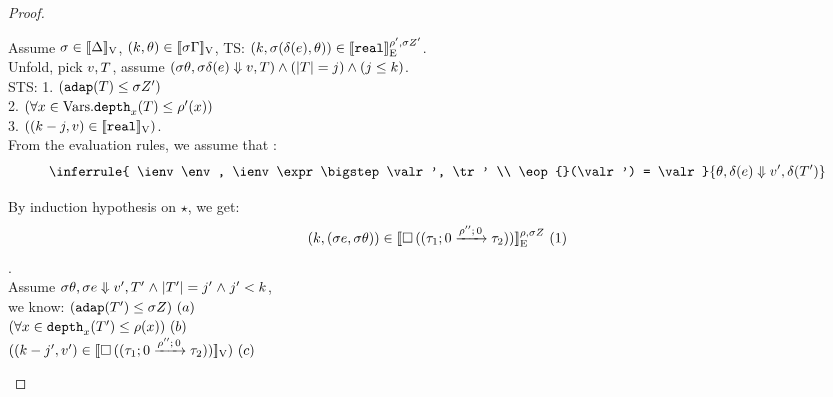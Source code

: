\documentclass[a4paper,11pt]{article}
\theoremstyle{definition}
\begin{document}
\begin{proof}
\begin{mainitem}
Assume $ \ienv \in \lrv{\Delta}$, $(\stepiA, \env) \in \lrv{\ienv \Gamma}$, TS: $(\stepiA, \ienv (\eop(\expr), \env)) \in \lre{\dmap'}{\ienv \nnatA'}{\treal}$.\\
%
Unfold, pick $\valr, \tr$, assume  $(\ienv \env, \ienv \eop(\expr) \bigstep \valr, \tr) \land (\size{\tr} = j) \land (j \leq \stepiA)$.\\
%
STS: 
1.
$(\adap(\tr) \leq \ienv \nnatA') $ \\ 
2. $ (\forall x \in \mbox{Vars}. \ddep{x}(\tr) \leq \dmap'(x)) $ \\
3.  $ ((\stepiA - j, \valr) \in \lrv{\treal})$.\\
%
From the evaluation rules, we assume that :
\[
 \inferrule{
    \ienv \env, \ienv \expr \bigstep \valr', \tr' \\
    \eop{}(\valr') = \valr
  }{
    \env, \eop(\expr) \bigstep \valr', \trop(\tr')
  }
\]

By induction hypothesis on $\star$, we get:
 \[
(\stepiA, (\ienv \expr, \ienv \env)) \in \lre{\dmap}{\ienv \nnatA}{\tbox{
    (\tarr{ \tau_1}{ \tau_2 }{0}{\dmap''}{0})}} ~ (1)
\].\\
%
Assume $\ienv \env, \ienv \expr \bigstep \valr', \tr' \conj |\tr'|=j'
\conj j' < \stepiA$,\\
 we know: $(\adap(\tr') \leq \ienv \nnatA) ~ (a) $ \\
$ (\forall x \in \ddep{x}(\tr') \leq \dmap(x)) ~ (b)$ \\
$ ((\stepiA - j', \valr') \in \lrv{\tbox{  (\tarr{ \tau_1}{
      \tau_2 }{0}{\dmap''}{0})     }}) ~ (c)$ \\


\end{mainitem}
\end{proof}
\end{document}
